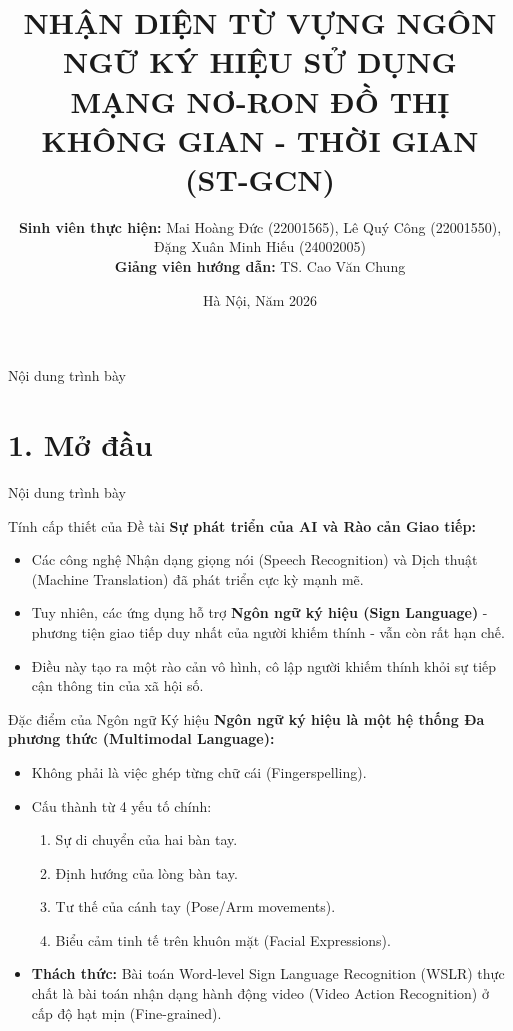 \documentclass[aspectratio=169]{beamer}
\title[Nhận diện Ngôn ngữ Ký hiệu bằng ST-GCN]{NHẬN DIỆN TỪ VỰNG NGÔN NGỮ KÝ HIỆU SỬ DỤNG MẠNG NƠ-RON ĐỒ THỊ KHÔNG GIAN - THỜI GIAN (ST-GCN)}
\author[Nhóm SV]{
    \small
    \textbf{Sinh viên thực hiện:}
    Mai Hoàng Đức (22001565),
    Lê Quý Công (22001550),
    Đặng Xuân Minh Hiếu (24002005)\\
    \vspace{0.1cm}
    \textbf{Giảng viên hướng dẫn:}
    TS. Cao Văn Chung
}
\institute[ĐHKHTN - K. Toán-Cơ-Tin]{Khoa Toán - Cơ - Tin học \\ Trường Đại học Khoa học Tự nhiên}
\date{Hà Nội, Năm 2026}
\begin{document}
\begin{frame}
    \titlepage
\end{frame}

\begin{frame}{Nội dung trình bày}
    \tableofcontents[hideallsubsections]
\end{frame}

\section{1. Mở đầu}
\begin{frame}{Nội dung trình bày}
\end{frame}

\begin{frame}{Tính cấp thiết của Đề tài}
    \textbf{Sự phát triển của AI và Rào cản Giao tiếp:}
    \begin{itemize}
        \item Các công nghệ Nhận dạng giọng nói (Speech Recognition) và Dịch thuật (Machine Translation) đã phát triển cực kỳ mạnh mẽ.
        \item Tuy nhiên, các ứng dụng hỗ trợ \textbf{Ngôn ngữ ký hiệu (Sign Language)} - phương tiện giao tiếp duy nhất của người khiếm thính - vẫn còn rất hạn chế.
        \item Điều này tạo ra một rào cản vô hình, cô lập người khiếm thính khỏi sự tiếp cận thông tin của xã hội số.
    \end{itemize}
\end{frame}

\begin{frame}{Đặc điểm của Ngôn ngữ Ký hiệu}
    \textbf{Ngôn ngữ ký hiệu là một hệ thống Đa phương thức (Multimodal Language):}
    \begin{itemize}
        \item Không phải là việc ghép từng chữ cái (Fingerspelling).
        \item Cấu thành từ 4 yếu tố chính:
        \begin{enumerate}
            \item Sự di chuyển của hai bàn tay.
            \item Định hướng của lòng bàn tay.
            \item Tư thế của cánh tay (Pose/Arm movements).
            \item Biểu cảm tinh tế trên khuôn mặt (Facial Expressions).
        \end{enumerate}
        \item \textbf{Thách thức:} Bài toán Word-level Sign Language Recognition (WSLR) thực chất là bài toán nhận dạng hành động video (Video Action Recognition) ở cấp độ hạt mịn (Fine-grained).
    \end{itemize}
\end{frame}
\end{document}
